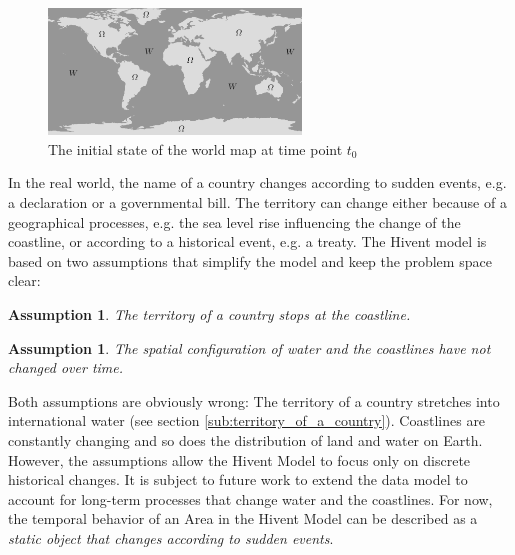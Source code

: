 \begin{figure}[H]
  \centering
  \includegraphics[width=0.6\textwidth]{graphics/development/hivent_model/init_map}
  \caption{The initial state of the world map at time point $t_0$}
  \label{fig:init_map}
\end{figure}

In the real world, the name of a country changes according to sudden events, e.g. a declaration or a governmental bill. The territory can change either because of a geographical processes, e.g. the sea level rise influencing the change of the coastline, or according to a historical event, e.g. a treaty. The Hivent model is based on two assumptions that simplify the model and keep the problem space clear:

\vspace{-0.0em}
\newtheorem{coastline_territory}[assicounter]{Assumption}
\begin{coastline_territory}
\label{axm:coastline_territory}
  The territory of a country stops at the coastline.
\end{coastline_territory}

\vspace{-2.0em}
\newtheorem{constant_coastlines}[assicounter]{Assumption}
\begin{constant_coastlines}
\label{axm:constant_coastlines}
  The spatial configuration of water and the coastlines have not changed over time.
\end{constant_coastlines}

Both assumptions are obviously wrong: The territory of a country stretches into international water (see section \ref{sub:territory_of_a_country}). Coastlines are constantly changing and so does the distribution of land and water on Earth. However, the assumptions allow the Hivent Model to focus only on discrete historical changes. It is subject to future work to extend the data model to account for long-term processes that change water and the coastlines. For now, the temporal behavior of an Area in the Hivent Model can be described as a \emph{static object that changes according to sudden events}.

